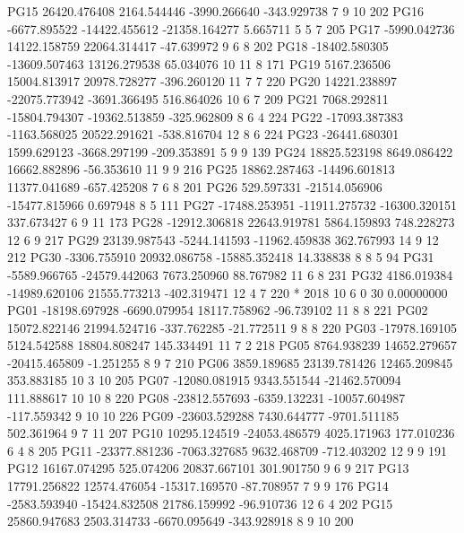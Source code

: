 PG15  26420.476408   2164.544446  -3990.266640   -343.929738  7  9 10 202       
PG16  -6677.895522 -14422.455612 -21358.164277      5.665711  5  5  7 205       
PG17  -5990.042736  14122.158759  22064.314417    -47.639972  9  6  8 202       
PG18 -18402.580305 -13609.507463  13126.279538     65.034076 10 11  8 171       
PG19   5167.236506  15004.813917  20978.728277   -396.260120 11  7  7 220       
PG20  14221.238897 -22075.773942  -3691.366495    516.864026 10  6  7 209       
PG21   7068.292811 -15804.794307 -19362.513859   -325.962809  8  6  4 224       
PG22 -17093.387383  -1163.568025  20522.291621   -538.816704 12  8  6 224       
PG23 -26441.680301   1599.629123  -3668.297199   -209.353891  5  9  9 139       
PG24  18825.523198   8649.086422  16662.882896    -56.353610 11  9  9 216       
PG25  18862.287463 -14496.601813  11377.041689   -657.425208  7  6  8 201       
PG26    529.597331 -21514.056906 -15477.815966      0.697948  8     5 111       
PG27 -17488.253951 -11911.275732 -16300.320151    337.673427  6  9 11 173       
PG28 -12912.306818  22643.919781   5864.159893    748.228273 12  6  9 217       
PG29  23139.987543  -5244.141593 -11962.459838    362.767993 14  9 12 212       
PG30  -3306.755910  20932.086758 -15885.352418     14.338838  8  8  5  94       
PG31  -5589.966765 -24579.442063   7673.250960     88.767982 11  6  8 231       
PG32   4186.019384 -14989.620106  21555.773213   -402.319471 12  4  7 220       
*  2018 10  6  0 30  0.00000000
PG01 -18198.697928  -6690.079954  18117.758962    -96.739102 11  8  8 221       
PG02  15072.822146  21994.524716   -337.762285    -21.772511  9  8  8 220       
PG03 -17978.169105   5124.542588  18804.808247    145.334491 11  7  2 218       
PG05   8764.938239  14652.279657 -20415.465809     -1.251255  8  9  7 210       
PG06   3859.189685  23139.781426  12465.209845    353.883185 10  3 10 205       
PG07 -12080.081915   9343.551544 -21462.570094    111.888617 10 10  8 220       
PG08 -23812.557693  -6359.132231 -10057.604987   -117.559342  9 10 10 226       
PG09 -23603.529288   7430.644777  -9701.511185    502.361964  9  7 11 207       
PG10  10295.124519 -24053.486579   4025.171963    177.010236  6  4  8 205       
PG11 -23377.881236  -7063.327685   9632.468709   -712.403202 12  9  9 191       
PG12  16167.074295    525.074206  20837.667101    301.901750  9  6  9 217       
PG13  17791.256822  12574.476054 -15317.169570    -87.708957  7  9  9 176       
PG14  -2583.593940 -15424.832508  21786.159992    -96.910736 12  6  4 202       
PG15  25860.947683   2503.314733  -6670.095649   -343.928918  8  9 10 200       
